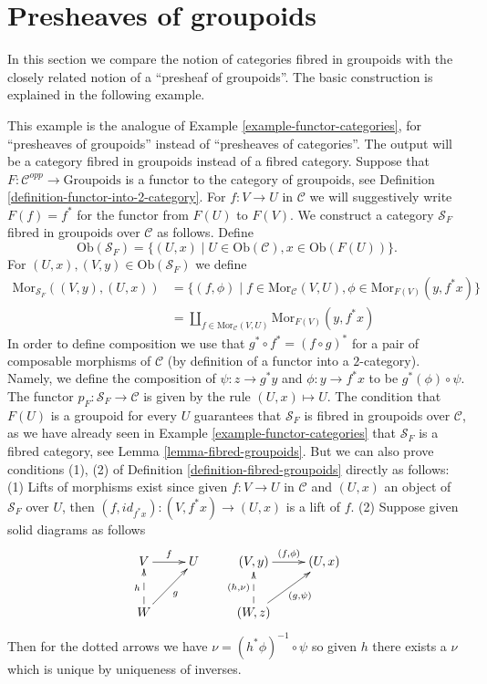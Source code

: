 \section{Presheaves of groupoids}
\label{section-presheaves-groupoids}

\noindent
In this section we compare the notion of categories fibred in groupoids
with the closely related notion of a ``presheaf of groupoids''. The basic
construction is explained in the following example.

\begin{example}
\label{example-functor-groupoids}
This example is the analogue of
Example \ref{example-functor-categories},
for ``presheaves of groupoids'' instead of ``presheaves of categories''.
The output will be a category fibred in groupoids instead of a fibred category.
Suppose that $F : \mathcal{C}^{opp} \to \text{Groupoids}$ is a functor
to the category of groupoids, see
Definition \ref{definition-functor-into-2-category}.
For $f : V \to U$ in $\mathcal{C}$ we will
suggestively write $F(f) = f^\ast$ for the functor from $F(U)$ to $F(V)$.
We construct a category $\mathcal{S}_F$ fibred in groupoids over $\mathcal{C}$
as follows. Define
$$
\text{Ob}(\mathcal{S}_F) =
\{(U, x) \mid U\in \text{Ob}(\mathcal{C}), x\in \text{Ob}(F(U))\}.
$$
For $(U, x), (V, y) \in \text{Ob}(\mathcal{S}_F)$ we define
\begin{align*}
\text{Mor}_{\mathcal{S}_F}((V, y), (U, x))
& =
\{ (f, \phi) \mid f \in \text{Mor}_\mathcal{C}(V, U),
\phi \in \text{Mor}_{F(V)}(y, f^\ast x)\} \\
& = 
\coprod\nolimits_{f \in \text{Mor}_\mathcal{C}(V, U)}
\text{Mor}_{F(V)}(y, f^\ast x)
\end{align*}
In order to define composition we use that $g^\ast \circ f^\ast =
(f \circ g)^\ast$ for a pair of composable morphisms of $\mathcal{C}$
(by definition of a functor into a $2$-category).
Namely, we define the composition of $\psi : z \to g^\ast y$ and
$ \phi : y \to f^\ast x$ to be $ g^\ast(\phi) \circ \psi$. The functor
$p_F : \mathcal{S}_F \to \mathcal{C}$ is given by the rule $(U, x) \mapsto U$.
The condition that $F(U)$ is a groupoid for every $U$ guarantees that
$\mathcal{S}_F$ is fibred in groupoids over $\mathcal{C}$, as we have
already seen in
Example \ref{example-functor-categories}
that $\mathcal{S}_F$ is a fibred category, see
Lemma \ref{lemma-fibred-groupoids}.
But we can also prove conditions (1), (2) of
Definition \ref{definition-fibred-groupoids}
directly as follows: (1) Lifts of
morphisms exist since given $f: V \to U$ in $\mathcal{C}$ and $(U, x)$
an object of $\mathcal{S}_F$ over $U$, then
$(f, id_{f^\ast x}): (V, {f^\ast x}) \to (U, x)$ is a lift of $f$.
(2) Suppose given solid diagrams as follows
$$
\xymatrix{
V \ar[r]^f & U & (V, y) \ar[r]^{(f, \phi)} & (U, x) \\
W \ar@{-->}[u]^h \ar[ru]_g & &
(W, z) \ar@{-->}[u]^{(h, \nu)} \ar[ru]_{(g, \psi)} & \\
}
$$
Then for the dotted arrows we have $\nu = (h^\ast \phi)^{-1} \circ \psi$
so given $h$ there exists a $\nu$ which is unique by uniqueness of inverses.
\end{example}

